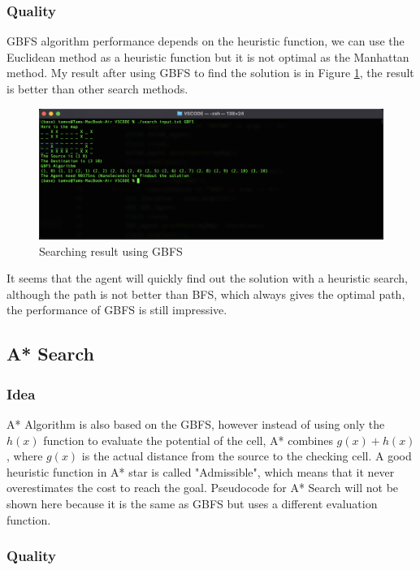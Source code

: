\documentclass{assignment}
\begin{document}
\subsubsection{Quality}

GBFS algorithm performance depends on the heuristic function, we can use the Euclidean method as a heuristic function but it is not optimal as the Manhattan method. My result after using GBFS to find the solution is in Figure \ref{fig:fig12}, the result is better than other search methods. 

\begin{figure}[h]
    \centering
    \includegraphics[width=1\textwidth]{./assets/GBFS.png}
    \caption{Searching result using GBFS}
    \label{fig:fig12}
\end{figure}

It seems that the agent will quickly find out the solution with a heuristic search, although the path is not better than BFS, which always gives the optimal path, the performance of GBFS is still impressive. 

\subsection{A* Search}

\subsubsection{Idea}
A* Algorithm is also based on the GBFS, however instead of using only the $h(x)$ function to evaluate the potential of the cell, A* combines $g(x) + h(x)$, where $g(x)$ is the actual distance from the source to the checking cell. A good heuristic function in A* star is called "Admissible", which means that it never overestimates the cost to reach the goal. Pseudocode for A* Search will not be shown here because it is the same as GBFS but uses a different evaluation function.

\subsubsection{Quality}
\end{document}
